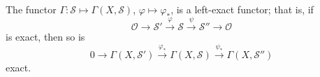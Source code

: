 The functor $\Gamma : \mathcal{S} \mapsto \Gamma(X, \mathcal{S})$, $\varphi \mapsto \varphi_*$, is a left-exact functor; that is, if
$$\mathcal{O} \rightarrow \mathcal{S}' \xrightarrow{\varphi} \mathcal{S} \xrightarrow{\psi} \mathcal{S}'' \rightarrow \mathcal{O}$$
is exact, then so is
$$0 \rightarrow \Gamma(X, \mathcal{S}') \xrightarrow{\varphi_*} \Gamma(X, \mathcal{S}) \xrightarrow{\psi_*} \Gamma(X, \mathcal{S}'')$$
exact.
